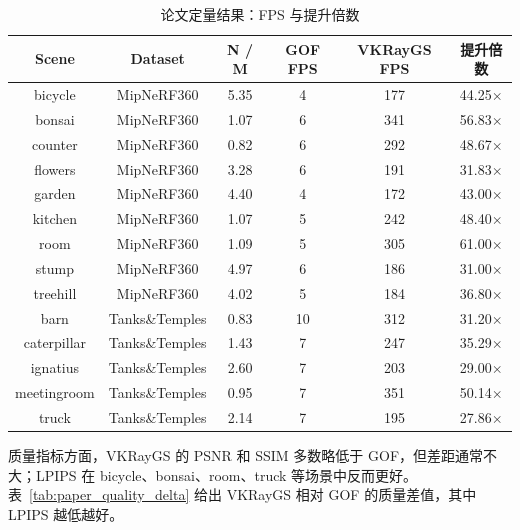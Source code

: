 \documentclass[12pt,hyperref,a4paper,UTF8]{ctexart}
\begin{document}
\begin{table}[H]
    \centering
    \caption{论文定量结果：FPS 与提升倍数}
    \label{tab:paper_fps}
    \setlength{\tabcolsep}{2.5pt}
    \renewcommand{\arraystretch}{1.15}
    \begin{tabular}{cccccc}
        \bottomrule[1.5pt]
        \textbf{Scene} & \textbf{Dataset} & \textbf{N / M} & \textbf{GOF FPS} & \textbf{VKRayGS FPS} & \textbf{提升倍数} \\
        \midrule[0.5pt]
        bicycle & MipNeRF360 & 5.35 & 4 & 177 & 44.25$\times$ \\
        bonsai & MipNeRF360 & 1.07 & 6 & 341 & 56.83$\times$ \\
        counter & MipNeRF360 & 0.82 & 6 & 292 & 48.67$\times$ \\
        flowers & MipNeRF360 & 3.28 & 6 & 191 & 31.83$\times$ \\
        garden & MipNeRF360 & 4.40 & 4 & 172 & 43.00$\times$ \\
        kitchen & MipNeRF360 & 1.07 & 5 & 242 & 48.40$\times$ \\
        room & MipNeRF360 & 1.09 & 5 & 305 & 61.00$\times$ \\
        stump & MipNeRF360 & 4.97 & 6 & 186 & 31.00$\times$ \\
        treehill & MipNeRF360 & 4.02 & 5 & 184 & 36.80$\times$ \\
        barn & Tanks\&Temples & 0.83 & 10 & 312 & 31.20$\times$ \\
        caterpillar & Tanks\&Temples & 1.43 & 7 & 247 & 35.29$\times$ \\
        ignatius & Tanks\&Temples & 2.60 & 7 & 203 & 29.00$\times$ \\
        meetingroom & Tanks\&Temples & 0.95 & 7 & 351 & 50.14$\times$ \\
        truck & Tanks\&Temples & 2.14 & 7 & 195 & 27.86$\times$ \\
        \toprule[1.5pt]
    \end{tabular}
\end{table}

质量指标方面，VKRayGS 的 PSNR 和 SSIM 多数略低于 GOF，但差距通常不大；LPIPS 在 bicycle、bonsai、room、truck 等场景中反而更好。表~\ref{tab:paper_quality_delta} 给出 VKRayGS 相对 GOF 的质量差值，其中 LPIPS 越低越好。
\end{document}
